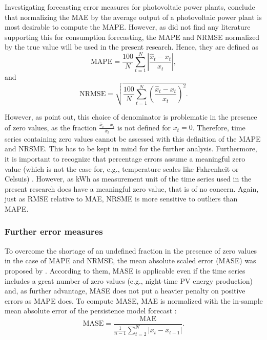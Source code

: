 Investigating forecasting error measures for photovoltaic power plants, \citet{Hoff:2013} conclude that normalizing the MAE by the average output of a photovoltaic power plant is most desirable to compute the MAPE. However, as \citet{Meer:2018} did not find any literature supporting this for consumption forecasting, the MAPE and NRMSE normalized by the true value will be used in the present research. Hence, they are defined as
%
\begin{equation} \label{Eq:MAPE}
\text{MAPE}=\frac{100}{N}\sum_{t=1}^N\left|\frac{\widehat{x}_t-x_t}{x_t}\right|,
\end{equation}
and
\begin{equation} \label{Eq:NRMSE}
\text{NRMSE}=\sqrt{\frac{100}{N}\sum_{t=1}^N\left(\frac{\widehat{x}_t-x_t}{x_t}\right)^2}.
\end{equation}

\noindent However, as \citet{Hyndman:2006} point out, this choice of denominator is problematic in the presence of zero values, as the fraction $\frac{\widehat{x}_i-x_i}{\bar{x}_t}$ is not defined for $x_t=0$. Therefore, time series containing zero values cannot be assessed with this definition of the MAPE and NRSME. This has to be kept in mind for the further analysis. Furthermore, it is important to recognize that percentage errors assume a meaningful zero value (which is not the case for, e.g., temperature scales like Fahrenheit or Celsuis) \citep{Hyndman:2006}. However, as kWh as measurement unit of the time series used in the present research does have a meaningful zero value, that is of no concern. Again, just as RMSE relative to MAE, NRSME is more sensitive to outliers than MAPE.


\subsubsection{Further error measures}

To overcome the shortage of an undefined fraction in the presence of zero values in the case of MAPE and NRMSE, the mean absolute scaled error (MASE) was proposed by \citet{Hyndman:2006}. According to them, MASE is applicable even if the time series includes a great number of zero values (e.g., night-time PV energy production) and, as further advantage, MASE does not put a heavier penalty on positive errors as MAPE does. To compute MASE, MAE is normalized with the in-sample mean absolute error of the persistence model forecast \citep{Hyndman:2006}:
%
\begin{equation} \label{Eq:MASE}
\text{MASE}=\frac{\text{MAE}}{\frac{1}{n-1}\sum_{t=2}^N\left|x_t-x_{t-1}\right|}.
\end{equation}

